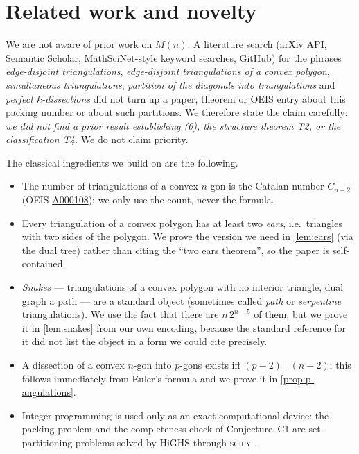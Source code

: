 \documentclass[11pt,a4paper]{article}
\theoremstyle{definition}
\theoremstyle{remark}
\begin{document}
\section{Related work and novelty}

We are not aware of prior work on $M(n)$.  A literature search (arXiv API, Semantic
Scholar, MathSciNet-style keyword searches, GitHub) for the phrases \emph{edge-disjoint
triangulations}, \emph{edge-disjoint triangulations of a convex polygon},
\emph{simultaneous triangulations}, \emph{partition of the diagonals into triangulations}
and \emph{perfect $k$-dissections} did not turn up a paper, theorem or OEIS entry about
this packing number or about such partitions.  We therefore state the claim carefully:
\emph{we did not find a prior result establishing (0), the structure theorem T2, or the
classification T4.}  We do not claim priority.

The classical ingredients we build on are the following.
\begin{itemize}
\item The number of triangulations of a convex $n$-gon is the Catalan number $C_{n-2}$
(OEIS \href{https://oeis.org/A000108}{A000108}); we only use the count, never the formula.
\item Every triangulation of a convex polygon has at least two \emph{ears}, i.e.\ triangles
with two sides of the polygon.  We prove the version we need in \cref{lem:ears} (via the
dual tree) rather than citing the ``two ears theorem'', so the paper is self-contained.
\item \emph{Snakes} --- triangulations of a convex polygon with no interior triangle, dual
graph a path --- are a standard object (sometimes called \emph{path} or \emph{serpentine}
triangulations).  We use the fact that there are $n\,2^{n-5}$ of them, but we prove it in
\cref{lem:snakes} from our own encoding, because the standard reference for it did not
list the object in a form we could cite precisely.
\item A dissection of a convex $n$-gon into $p$-gons exists iff $(p-2)\mid(n-2)$; this
follows immediately from Euler's formula and we prove it in
\cref{prop:p-angulations}.
\item Integer programming is used only as an exact computational device: the packing
problem and the completeness check of Conjecture~C1 are set-partitioning problems solved by
HiGHS \cite{huangfu2018} through \textsc{scipy} \cite{virtanen2020}.
\end{itemize}
\end{document}
